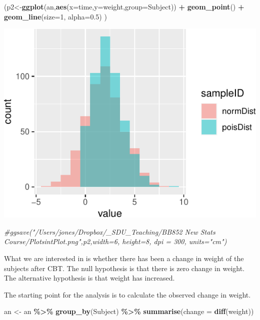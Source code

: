 \documentclass[
  a4paperpaper,
]{book}
\newenvironment{Shaded}{\begin{snugshade}}{\end{snugshade}}
\newcommand{\CommentTok}[1]{\textcolor[rgb]{0.56,0.35,0.01}{\textit{#1}}}
\newcommand{\DataTypeTok}[1]{\textcolor[rgb]{0.13,0.29,0.53}{#1}}
\newcommand{\DecValTok}[1]{\textcolor[rgb]{0.00,0.00,0.81}{#1}}
\newcommand{\FloatTok}[1]{\textcolor[rgb]{0.00,0.00,0.81}{#1}}
\newcommand{\KeywordTok}[1]{\textcolor[rgb]{0.13,0.29,0.53}{\textbf{#1}}}
\newcommand{\NormalTok}[1]{#1}
\newcommand{\OperatorTok}[1]{\textcolor[rgb]{0.81,0.36,0.00}{\textbf{#1}}}
\newcommand{\StringTok}[1]{\textcolor[rgb]{0.31,0.60,0.02}{#1}}
\begin{document}
\begin{Shaded}
\begin{Highlighting}[]
\NormalTok{(p2\textless{}{-}}\KeywordTok{ggplot}\NormalTok{(an,}\KeywordTok{aes}\NormalTok{(}\DataTypeTok{x=}\NormalTok{time,}\DataTypeTok{y=}\NormalTok{weight,}\DataTypeTok{group=}\NormalTok{Subject)) }\OperatorTok{+}
\StringTok{   }\KeywordTok{geom\_point}\NormalTok{() }\OperatorTok{+}\StringTok{ }
\StringTok{   }\KeywordTok{geom\_line}\NormalTok{(}\DataTypeTok{size=}\DecValTok{1}\NormalTok{, }\DataTypeTok{alpha=}\FloatTok{0.5}\NormalTok{)}
\NormalTok{ )}
\end{Highlighting}
\end{Shaded}

\includegraphics{BB852_files/figure-latex/unnamed-chunk-149-1.pdf}

\begin{Shaded}
\begin{Highlighting}[]
\CommentTok{\#ggsave("/Users/jones/Dropbox/\_SDU\_Teaching/BB852 New Stats Course/PlotsintPlot.png",p2,width=6, height=8, dpi = 300, units="cm")}
\end{Highlighting}
\end{Shaded}

What we are interested in is whether there has been a change in weight of the subjects after CBT. The null hypothesis is that there is zero change in weight. The alternative hypothesis is that weight has increased.

The starting point for the analysis is to calculate the observed change in weight.

\begin{Shaded}
\begin{Highlighting}[]
\NormalTok{an \textless{}{-}}\StringTok{ }\NormalTok{an }\OperatorTok{\%\textgreater{}\%}\StringTok{ }
\StringTok{  }\KeywordTok{group\_by}\NormalTok{(Subject) }\OperatorTok{\%\textgreater{}\%}\StringTok{ }
\StringTok{  }\KeywordTok{summarise}\NormalTok{(}\DataTypeTok{change =} \KeywordTok{diff}\NormalTok{(weight))}
\end{Highlighting}
\end{Shaded}
\end{document}
